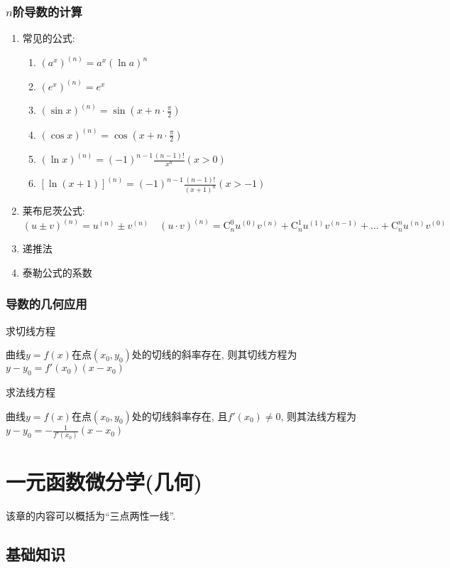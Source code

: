 \subsection{$ n $阶导数的计算}
\begin{enumerate}
\item 常见的公式:
\begin{enumerate}
\item $ (a^{x})^{(n)}=a^{x}(\ln a)^{n} $
\item $ (e^{x})^{(n)}=e^{x} $
\item $ (\sin x)^{(n)}=\sin (x+n\cdot \frac{\pi}{2}) $
\item $ (\cos x)^{(n)}=\cos (x+n\cdot \frac{\pi}{2}) $
\item $ (\ln x)^{(n)}=(-1)^{n-1}\frac{(n-1)!}{x^{n}}(x>0) $
\item $ [\ln (x+1)]^{(n)}=(-1)^{n-1}\frac{(n-1)!}{(x+1)^{n}}(x>-1) $
\end{enumerate}
\item 莱布尼茨公式:
\begin{equation*}
(u\pm v)^{(n)}=u^{(n)}\pm v^{(n)}\quad (u\cdot v)^{(n)}=\mathrm{C}_{n}^{0}u^{(0)}v^{(n)}+\mathrm{C}_{n}^{1}u^{(1)}v^{(n-1)}+\dots+\mathrm{C}_{n}^{n}u^{(n)}v^{(0)}
\end{equation*}
\item 递推法
\item 泰勒公式的系数
\end{enumerate}
\subsection{导数的几何应用}
{\kaishu 求切线方程} \par \vspace{.5em}
曲线$ y=f(x) $在点$ (x_{0}, y_{0}) $处的切线的斜率存在, 则其切线方程为$ y-y_{0}=f'(x_{0})(x-x_{0}) $ \par \vspace{.5em}
{\kaishu 求法线方程} \par \vspace{.5em}
曲线$ y=f(x) $在点$ (x_{0}, y_{0}) $处的切线斜率存在, 且$ f'(x_{0})\neq 0 $, 则其法线方程为$ y-y_{0}=-\frac{1}{f'(x_{0})}(x-x_{0}) $ \par \vspace{.5em}
\chapter{一元函数微分学(几何)}
该章的内容可以概括为``三点两性一线''.
\section{基础知识}
